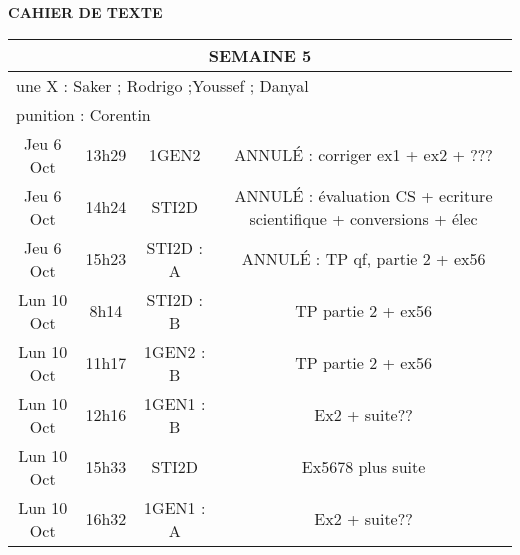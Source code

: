 \documentclass[10pt]{article}
\newcommand{\mypage}[1]{ 
		\begin{minipage}[c]{0.45\textwidth}
			\vspace{5pt}
			{#1}
			\vspace{5pt}
		\end{minipage}
}
\newcommand{\seancea}{\mypage{ ANNULÉ :
	corriger ex1
	+ ex2 + ???
	}}
\newcommand{\seanceb}{\mypage{ANNULÉ : évaluation CS + ecriture scientifique + conversions + élec}}
\newcommand{\seancec}{\mypage{ANNULÉ : TP qf, partie 2 + ex56}}
\newcommand{\seanced}{\mypage{TP partie 2 + ex56}}
\newcommand{\seancee}{\mypage{Ex2 + suite??}}
\newcommand{\seancef}{\mypage{Ex5678 plus suite}}
\newcommand{\seanceg}{\mypage{Ex2 + suite??}}
\begin{document}
\begin{center}
	\textbf{CAHIER DE TEXTE}
\end{center}

\setlength{\tabcolsep}{13pt}
\renewcommand{\arraystretch}{2.5}
\begin{longtable}{@{}|c|c|c|c|@{}} \toprule
	\midrule\multicolumn{4}{||c||}{SEMAINE 5}                       \\\midrule
	\multicolumn{4}{|l|}{une X : Saker ; Rodrigo ;Youssef ; Danyal} \\\midrule
	\multicolumn{4}{|l|}{punition : Corentin}                       \\\midrule
	Jeu 6 Oct  & 13h29 & 1GEN2     & \seancea                       \\\midrule
	Jeu 6 Oct  & 14h24 & STI2D     & \seanceb                       \\\midrule
	Jeu 6 Oct  & 15h23 & STI2D : A & \seancec                       \\\midrule\midrule
	Lun 10 Oct & 8h14  & STI2D : B & \seanced                       \\\midrule
	Lun 10 Oct & 11h17 & 1GEN2 : B & \seanced                       \\\midrule
	Lun 10 Oct & 12h16 & 1GEN1 : B & \seancee                       \\\midrule
	Lun 10 Oct & 15h33 & STI2D     & \seancef                       \\\midrule
	Lun 10 Oct & 16h32 & 1GEN1 : A & \seanceg                       \\\midrule


	\bottomrule
\end{longtable}
\end{document}
